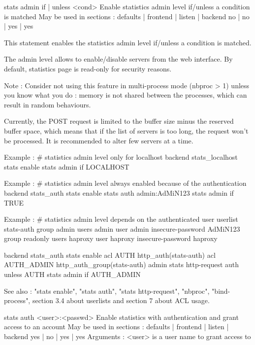 stats admin { if | unless } <cond>
  Enable statistics admin level if/unless a condition is matched
  May be used in sections :   defaults | frontend | listen | backend
                                 no    |    no    |   yes  |   yes

  This statement enables the statistics admin level if/unless a condition is
  matched.

  The admin level allows to enable/disable servers from the web interface. By
  default, statistics page is read-only for security reasons.

  Note : Consider not using this feature in multi-process mode (nbproc > 1)
         unless you know what you do : memory is not shared between the
         processes, which can result in random behaviours.

  Currently, the POST request is limited to the buffer size minus the reserved
  buffer space, which means that if the list of servers is too long, the
  request won't be processed. It is recommended to alter few servers at a
  time.

  Example :
    # statistics admin level only for localhost
    backend stats_localhost
        stats enable
        stats admin if LOCALHOST

  Example :
    # statistics admin level always enabled because of the authentication
    backend stats_auth
        stats enable
        stats auth  admin:AdMiN123
        stats admin if TRUE

  Example :
    # statistics admin level depends on the authenticated user
    userlist stats-auth
        group admin    users admin
        user  admin    insecure-password AdMiN123
        group readonly users haproxy
        user  haproxy  insecure-password haproxy

    backend stats_auth
        stats enable
        acl AUTH       http_auth(stats-auth)
        acl AUTH_ADMIN http_auth_group(stats-auth) admin
        stats http-request auth unless AUTH
        stats admin if AUTH_ADMIN

  See also : "stats enable", "stats auth", "stats http-request", "nbproc",
             "bind-process", section 3.4 about userlists and section 7 about
             ACL usage.


stats auth <user>:<passwd>
  Enable statistics with authentication and grant access to an account
  May be used in sections :   defaults | frontend | listen | backend
                                 yes   |    no    |   yes  |   yes
  Arguments :
    <user>    is a user name to grant access to

